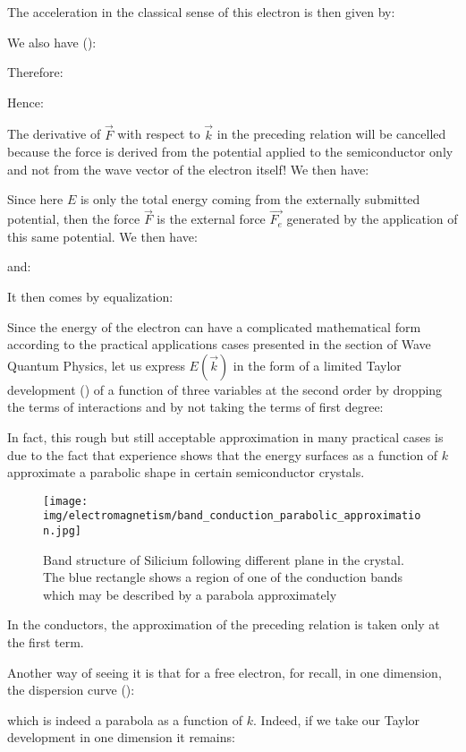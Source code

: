 	The acceleration in the classical sense of this electron is then given by:
	
	We also have ():
	
	Therefore:
	
	Hence:
	
	The derivative of $\vec{F}$ with respect to $\vec{k}$ in the preceding relation will be cancelled because the force is derived from the potential applied to the semiconductor only and not from the wave vector of the electron itself! We then have:
	
	Since here $E$ is only the total energy coming from the externally submitted potential, then the force $\vec{F}$ is the external force $\vec{F_e}$ generated by the application of this same potential. We then have:
	
	and:
	
	It then comes by equalization:
	
	Since the energy of the electron can have a complicated mathematical form according to the practical applications cases presented in the section of Wave Quantum Physics, let us express $E(\vec{k})$ in the form of a limited Taylor development () of a function of three variables at the second order by dropping the terms of interactions and by not taking the terms of first degree:
	
	In fact, this rough but still acceptable approximation in many practical cases is due to the fact that experience shows that the energy surfaces as a function of $k$ approximate a parabolic shape in certain semiconductor crystals.
	\begin{figure}[H]
		\centering
		\texttt{[image: img/electromagnetism/band\_conduction\_parabolic\_approximation.jpg]}
		\caption[]{Band structure of Silicium following different plane in the crystal. The blue rectangle shows a region of one of the conduction bands which may be described by a parabola approximately}
	\end{figure}
	In the conductors, the approximation of the preceding relation is taken only at the first term.

 	Another way of seeing it is that for a free electron, for recall, in one dimension, the dispersion curve ():
	
	which is indeed a parabola as a function of $k$. Indeed, if we take our Taylor development in one dimension it remains:
	
